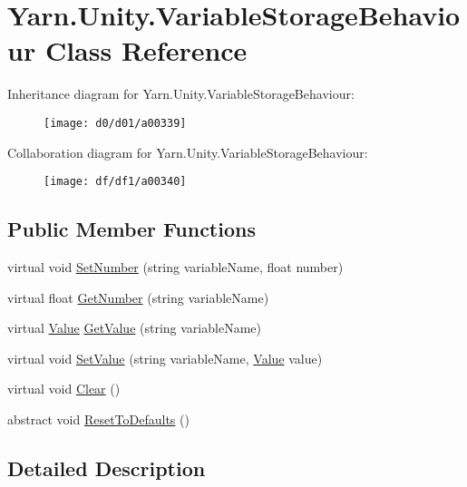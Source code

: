 \hypertarget{a00089}{\section{Yarn.\-Unity.\-Variable\-Storage\-Behaviour Class Reference}
\label{a00089}
}


Inheritance diagram for Yarn.\-Unity.\-Variable\-Storage\-Behaviour\-:
\nopagebreak
\begin{figure}[H]
\begin{center}
\leavevmode
\texttt{[image: d0/d01/a00339]}
\end{center}
\end{figure}


Collaboration diagram for Yarn.\-Unity.\-Variable\-Storage\-Behaviour\-:
\nopagebreak
\begin{figure}[H]
\begin{center}
\leavevmode
\texttt{[image: df/df1/a00340]}
\end{center}
\end{figure}
\subsection*{Public Member Functions}
\begin{DoxyCompactItemize}
\item 
virtual void \hyperlink{a00089_ac0d2f2e081944ad197992a26ad1a833c}{Set\-Number} (string variable\-Name, float number)
\item 
virtual float \hyperlink{a00089_add85a45dd65a5d4bd41c9d5ce5f77d19}{Get\-Number} (string variable\-Name)
\item 
virtual \hyperlink{a00086}{Value} \hyperlink{a00089_ac6ebafcbebc2b2d71eba8562490a2f1e}{Get\-Value} (string variable\-Name)
\item 
virtual void \hyperlink{a00089_a25f979b062d63c9e886fe7070ce4561b}{Set\-Value} (string variable\-Name, \hyperlink{a00086}{Value} value)
\item 
virtual void \hyperlink{a00089_a587fe10b367ace190e10f3bcb590a53c}{Clear} ()
\item 
abstract void \hyperlink{a00089_a33fcbff56561e53e0a70b59c56f0c3af}{Reset\-To\-Defaults} ()
\end{DoxyCompactItemize}


\subsection{Detailed Description}


